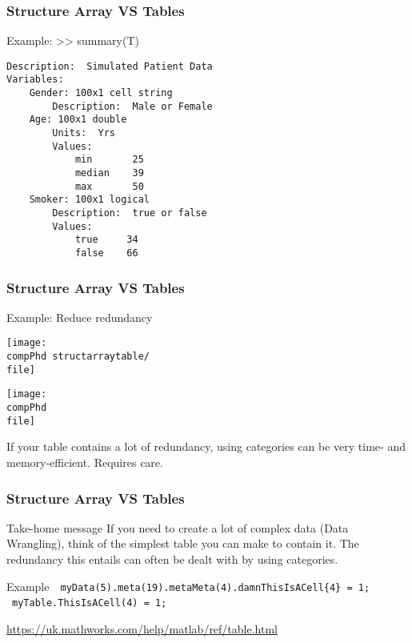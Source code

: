 \documentclass[]{beamer} %
\def\pathbase{/Users/pmxal9/} 	%
\def\pathbase{/Users/pmaal/} 	%
\edef\drop{\pathbase Dropbox/}		%
\edef\compPhd{\drop Nottingham/repos/phd/Seminars/+MatlabComputationalPhD/}
\begin{document}
\begin{frame}[fragile]
\frametitle{Structure Array VS Tables}\centering
\begin{exampleblock}{Example: >> summary(T)}\vspace{-4mm}
\begin{verbatim}
Description:  Simulated Patient Data
Variables:
    Gender: 100x1 cell string
        Description:  Male or Female
    Age: 100x1 double
        Units:  Yrs
        Values:
            min       25   
            median    39   
            max       50   
    Smoker: 100x1 logical
        Description:  true or false
        Values:
            true     34      
            false    66      
\end{verbatim}
\end{exampleblock}
\end{frame}


\begin{frame}[fragile]
\frametitle{Structure Array VS Tables}\centering
\begin{exampleblock}{Example: Reduce redundancy}
\def\file{dou}
\begin{center}\hspace{0mm}\texttt{[image: \\compPhd structarraytable/\\file]}\end{center}
\pause
\def\file{structarraytable/str}
\begin{center}\hspace{0mm}\texttt{[image: \\compPhd \\file]}\end{center}
\end{exampleblock}
If your table contains a lot of redundancy, using categories can be very time- and memory-efficient. 
Requires care.
\end{frame}


\begin{frame}[fragile]
\frametitle{Structure Array VS Tables}
\begin{block}{Take-home message}
If you need to create a lot of complex data (Data Wrangling), think of the simplest table you can make to contain it. 
The redundancy this entails can often be  dealt with by using categories.
\end{block}
\begin{exampleblock}{Example}
\ccr\,~\verb+myData(5).meta(19).metaMeta(4).damnThisIsACell{4} = 1;+\\
\cg\, \verb+myTable.ThisIsACell(4) = 1;+\\[3mm]
\end{exampleblock}
\url{https://uk.mathworks.com/help/matlab/ref/table.html}
\end{frame}
\end{document}
